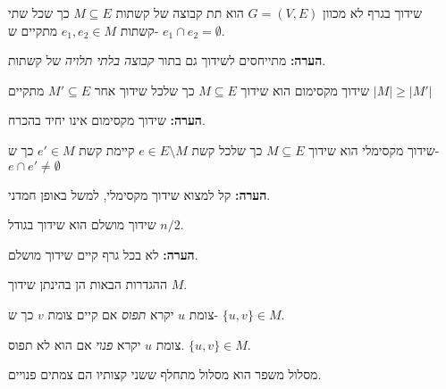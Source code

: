 \begin{definition}[שידוך]
שידוך בגרף לא מכוון
$G = (V, E)$
הוא תת קבוצה של קשתות 
$M \subseteq E$
כך שכל שתי קשתות
$e_1, e_2 \in M$
מתקיים ש-
$e_1 \cap e_2 = \emptyset$.
\end{definition}
\textbf{הערה:}
מתייחסים לשידוך גם בתור 
\emph{קבוצה בלתי תלויה}
של קשתות.

\begin{definition}
שידוך מקסימום הוא שידוך 
$M \subseteq E$
כך שלכל שידוך אחר
$M' \subseteq E$
מתקיים
$|M| \geq |M'|$
\end{definition}

\textbf{הערה:}
שידוך מקסימום אינו יחיד בהכרח.

\begin{definition}
שידוך מקסימלי הוא שידוך 
$M \subseteq E$
כך שלכל קשת 
$e \in E \setminus M$
קיימת קשת 
$e' \in M$
כך ש-
$e \cap e' \neq \emptyset$
\end{definition}

\textbf{הערה:}
קל למצוא שידוך מקסימלי, למשל באופן חמדני.

\begin{definition}
שידוך מושלם הוא שידוך בגודל 
$n/2$.
\end{definition}
\textbf{הערה:}
לא בכל גרף קיים שידוך מושלם.

ההגדרות הבאות הן בהינתן שידוך $M$.
\begin{definition}
צומת $u$ יקרא
\emph{תפוס}
אם קיים צומת $v$ כך ש-
$\{u, v\} \in M$.
\end{definition}

\begin{definition}
צומת $u$ יקרא
\emph{פנוי}
אם הוא לא תפוס.
$\{u, v\} \in M$.
\end{definition}

\begin{definition}[מסלול מתחלף]
מסלול (פשוט) 
$(e_1, \ldots, e_l)$
יקרא
\emph{מתחלף}
אם לכל 
$1 \leq i < l$
מתקיים ש-
$|\{e_i, e_{i + 1}}\} \cap M| = 1$
\end{definition}

\begin{definition}
מסלול משפר הוא מסלול מתחלף ששני קצותיו הם צמתים פנויים.
\end{definition}

\begin{figure}[h]
\centering

\end{figure}
